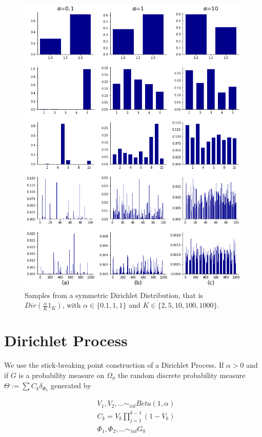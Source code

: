 \documentclass{article}
\begin{document}
\begin{figure}[h]
\centering
\includegraphics[scale=0.3]{img/dirichlet_samples.png}  
\caption{Samples from a symmetric Dirichlet Distribution, that is $Dir(\frac{\alpha}{K}1_{K})$, with $\alpha\in\{0.1, 1, 1\}$ and $K\in\{2, 5, 10, 100, 1000\}$.}
\end{figure}

\section{Dirichlet Process}

We use the stick-breaking point construction of a Dirichlet Process. If $\alpha>0$ and if $G$ is a probability measure on $\Omega_{\phi}$ the random discrete probability measure $\Theta:=\sum C_{k}\delta_{\Phi_{k}}$ generated by

\begin{align}
& V_{1}, V_{2}, \ldots \sim_{iid} Beta(1, \alpha)\\
& C_{k} = V_{k}\prod_{j=1}^{k-1}(1-V_{k})\\
& \Phi_{1}, \Phi_{2}, \ldots \sim_{iid} G_{0}
\end{align}
\end{document}
